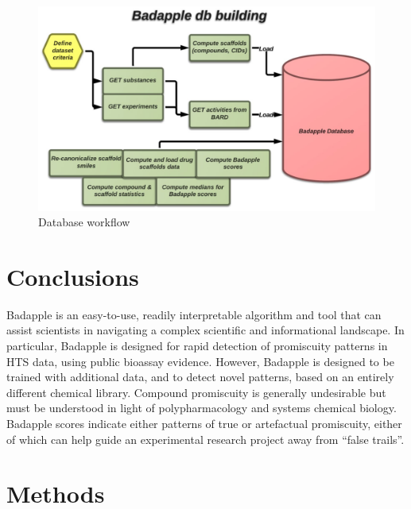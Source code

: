 \begin{figure}
	\includegraphics[width=\textwidth]{figures/badapple/Badapple_Fig7.png}
	\caption{Database workflow}
	\label{fig:BA_07}
\end{figure}

\section{Conclusions}

Badapple is an easy-to-use, readily interpretable algorithm and tool that can assist scientists in navigating a complex scientific and informational landscape. In particular, Badapple is designed for rapid detection of promiscuity patterns in HTS data, using public bioassay evidence. However, Badapple is designed to be trained with additional data, and to detect novel patterns, based on an entirely different chemical library. Compound promiscuity is generally undesirable but must be understood in light of polypharmacology and systems chemical biology. Badapple scores indicate either patterns of true or artefactual promiscuity, either of which can help guide an experimental research project away from “false trails”.

\section{Methods}

